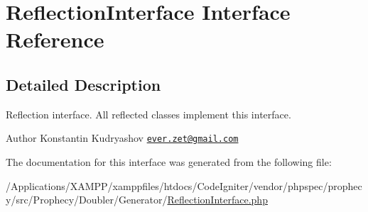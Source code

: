 \hypertarget{interface_prophecy_1_1_doubler_1_1_generator_1_1_reflection_interface}{}\section{Reflection\+Interface Interface Reference}
\label{interface_prophecy_1_1_doubler_1_1_generator_1_1_reflection_interface}


\subsection{Detailed Description}
Reflection interface. All reflected classes implement this interface.

\begin{DoxyAuthor}{Author}
Konstantin Kudryashov \href{mailto:ever.zet@gmail.com}{\tt ever.\+zet@gmail.\+com} 
\end{DoxyAuthor}


The documentation for this interface was generated from the following file\+:\begin{DoxyCompactItemize}
\item 
/\+Applications/\+X\+A\+M\+P\+P/xamppfiles/htdocs/\+Code\+Igniter/vendor/phpspec/prophecy/src/\+Prophecy/\+Doubler/\+Generator/\mbox{\hyperlink{_reflection_interface_8php}{Reflection\+Interface.\+php}}\end{DoxyCompactItemize}
